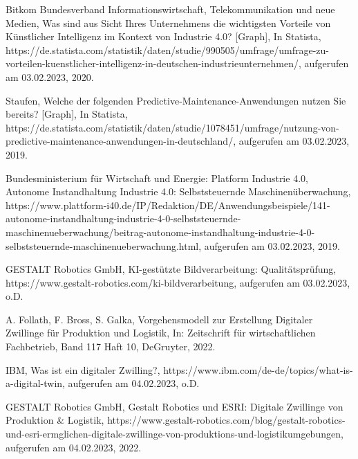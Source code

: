 \begin{thebibliography}{99}
	Bitkom Bundesverband Informationswirtschaft, Telekommunikation und neue Medien,
	Was sind aus Sicht Ihres Unternehmens die wichtigsten Vorteile von Künstlicher Intelligenz im Kontext von Industrie 4.0? [Graph],
	In Statista,
	https://de.statista.com/statistik/daten/studie/990505/umfrage/umfrage-zu-vorteilen-kuenstlicher-intelligenz-in-deutschen-industrieunternehmen/,
	aufgerufen am 03.02.2023,
	2020.

	Staufen,
	Welche der folgenden Predictive-Maintenance-Anwendungen nutzen Sie bereits? [Graph],
	In Statista,
	https://de.statista.com/statistik/daten/studie/1078451/umfrage/nutzung-von-predictive-maintenance-anwendungen-in-deutschland/,
	aufgerufen am 03.02.2023,
	2019.

	Bundesministerium für Wirtschaft und Energie: Platform Industrie 4.0,
	Autonome Instandhaltung Industrie 4.0: Selbststeuernde Maschinenüberwachung,
	https://www.plattform-i40.de/IP/Redaktion/DE/Anwendungsbeispiele/141-autonome-instandhaltung-industrie-4-0-selbststeuernde-maschinenueberwachung/beitrag-autonome-instandhaltung-industrie-4-0-selbststeuernde-maschinenueberwachung.html,
	aufgerufen am 03.02.2023,
	2019.

	GESTALT Robotics GmbH,
	KI-gestützte Bildverarbeitung: Qualitätsprüfung, 
	https://www.gestalt-robotics.com/ki-bildverarbeitung, 
	aufgerufen am 03.02.2023,
	o.D.

	A. Follath, F. Bross, S. Galka,	
	Vorgehensmodell zur Erstellung Digitaler Zwillinge für Produktion und Logistik,
	In: Zeitschrift für wirtschaftlichen Fachbetrieb, Band 117 Haft 10,
	DeGruyter,
	2022.

	IBM,
	Was ist ein digitaler Zwilling?,
	https://www.ibm.com/de-de/topics/what-is-a-digital-twin,
	aufgerufen am 04.02.2023,
	o.D.

	GESTALT Robotics GmbH,
	Gestalt Robotics und ESRI: Digitale Zwillinge von Produktion \& Logistik, 
	https://www.gestalt-robotics.com/blog/gestalt-robotics-und-esri-ermglichen-digitale-zwillinge-von-produktions-und-logistikumgebungen,
	aufgerufen am 04.02.2023,
	2022.

\end{thebibliography}